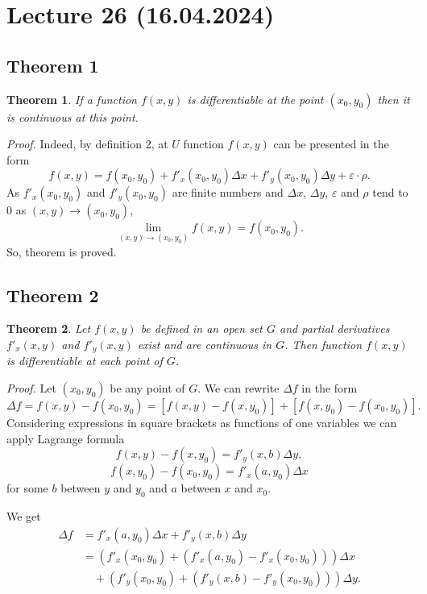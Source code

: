 \documentclass{article}
\newtheorem{theorem}{Theorem}
\begin{document}
\section*{Lecture 26 (16.04.2024)}

\subsection*{Theorem 1}

\begin{theorem}
If a function $f(x, y)$ is differentiable at the point $(x_0, y_0)$ then it is continuous at this point.
\end{theorem}

\vspace{1em}

\textit{Proof.} Indeed, by definition 2, at $U$ function $f(x, y)$ can be presented in the form
\[
f(x, y) = f(x_0, y_0) + f'_x (x_0, y_0)\Delta x + f'_y (x_0, y_0)\Delta y + \varepsilon \cdot \rho.
\]
As $f'_x (x_0, y_0)$ and $f'_y (x_0, y_0)$ are finite numbers and $\Delta x$, $\Delta y$, $\varepsilon$ and $\rho$ tend to 0 as $(x, y) \to (x_0, y_0)$,
\[
\lim_{(x, y) \to (x_0, y_0)} f(x, y) = f(x_0, y_0).
\]
So, theorem is proved.

\subsection*{Theorem 2}

\begin{theorem}
Let $f(x, y)$ be defined in an open set $G$ and partial derivatives $f'_x(x, y)$ and $f'_y(x, y)$ exist and are continuous in $G$. Then function $f(x, y)$ is differentiable at each point of $G$.
\end{theorem}

\vspace{1em}

\textit{Proof.} Let $(x_0, y_0)$ be any point of $G$. We can rewrite $\Delta f$ in the form
\[
\Delta f = f(x, y) - f(x_0, y_0) = [f(x, y) - f(x, y_0)] + [f(x, y_0) - f(x_0, y_0)].
\]
Considering expressions in square brackets as functions of one variables we can apply Lagrange formula
\[
f(x, y) - f(x, y_0) = f'_y(x, b)\Delta y,
\]
\[
f(x, y_0) - f(x_0, y_0) = f'_x(a, y_0)\Delta x
\]
for some $b$ between $y$ and $y_0$ and $a$ between $x$ and $x_0$.

We get
\begin{align*}
\Delta f &= f'_x (a, y_0)\Delta x + f'_y (x, b)\Delta y \\
&= \left(f'_x (x_0, y_0) + (f'_x (a, y_0) - f'_x (x_0, y_0))\right)\Delta x \\
&\quad + \left(f'_y (x_0, y_0) + (f'_y (x, b) - f'_y (x_0, y_0))\right)\Delta y.
\end{align*}
\end{document}

